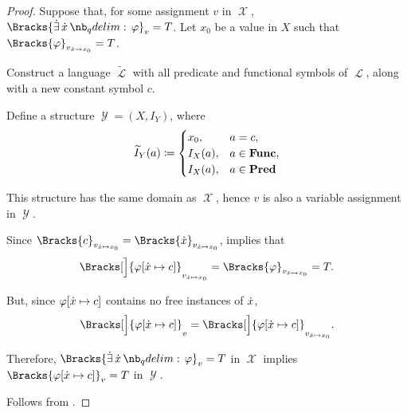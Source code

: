 \begin{proof}
  \SufficiencySubProof Suppose that, for some assignment \( v \) in \( \mscrX \), \( \Bracks{\qexists \synx \varphi}_v = T \). Let \( x_0 \) be a value in \( X \) such that \( \Bracks{\varphi}_{v_{\synx \to x_0}} = T \).

  Construct a language \( \widetilde \mscrL \) with all predicate and functional symbols of \( \mscrL \), along with a new constant symbol \( c \).

  Define a structure \( \mscrY = (X, I_Y) \), where
  \begin{equation*}
    \widetilde I_Y(a) \coloneqq \begin{cases}
      x_0,    &a = c, \\
      I_X(a), &a \in \op*{Func}, \\
      I_X(a), &a \in \op*{Pred}
    \end{cases}
  \end{equation*}

  This structure has the same domain as \( \mscrX \), hence \( v \) is also a variable assignment in \( \mscrY \).

  Since \( \Bracks{c}_{v_{\synx \mapsto x_0}} = \Bracks{\synx}_{v_{\synx \mapsto x_0}} \),  implies that
  \begin{equation*}
    \Bracks[\Big]{\varphi[\synx \mapsto c]}_{v_{\synx \mapsto x_0}} = \Bracks{\varphi}_{v_{\synx \mapsto x_0}} = T.
  \end{equation*}

  But, since \( \varphi[{\dot{x}} \mapsto c] \) contains no free instances of \( {\dot{x}} \),
  \begin{equation*}
    \Bracks[\Big]{\varphi[\synx \mapsto c]}_v = \Bracks[\Big]{\varphi[\synx \mapsto c]}_{v_{\synx \mapsto x_0}}.
  \end{equation*}

  Therefore, \( \Bracks{\qexists \synx \varphi}_v = T \) in \( \mscrX \) implies \( \Bracks{\varphi[\synx \mapsto c]}_v = T \) in \( \mscrY \).

  \NecessitySubProof Follows from .
\end{proof}

